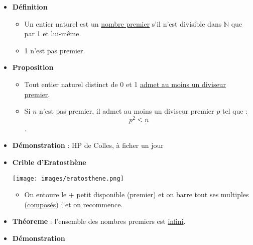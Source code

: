 \documentclass{report}
\newcommand{\N}{\mathbb{N}}
\begin{document}
        \begin{itemize}
          \item \textbf{Définition}
            \begin{itemize}[label=$\rightarrow$]
              \item Un entier naturel est un \underline{nombre premier} s'il n'est divisible dans $\N$ que par 1 et lui-même. 
              \item 1 n'est pas premier.
            \end{itemize}
          \item \textbf{Proposition}
            \begin{itemize}[label=$\rightarrow$]
              \item Tout entier naturel distinct de 0 et 1 \underline{admet au moins un diviseur premier}.
              \item Si $n$ n'est pas premier, il admet au moins un diviseur premier $p$ tel que : \[p^2\le n\].
            \end{itemize}

          \item \textbf{Démonstration} : HP de Colles, à ficher un jour
          \item \textbf{Crible d'Eratosthène}
            \begin{center}
              \texttt{[image: images/eratosthene.png]}
            \end{center}
            \begin{itemize}[label=$\rightarrow$]
              \item On entoure le + petit disponible (premier) et on barre tout ses multiples (\underline{composés}) ; et on recommence.
            \end{itemize}
          \item \textbf{Théoreme} : l'ensemble des nombres premiers est \underline{infini}.
          \item \textbf{Démonstration}


\end{itemize}
\end{document}
